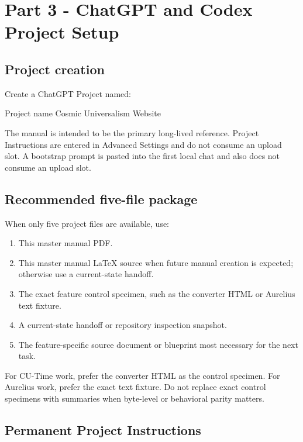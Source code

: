 \documentclass[11pt,letterpaper]{article}
\begin{document}
\section{Part 3 - ChatGPT and Codex Project Setup}

\subsection{Project creation}

Create a ChatGPT Project named:

\begin{codebox}{Project name}
Cosmic Universalism Website
\end{codebox}

The manual is intended to be the primary long-lived reference. Project
Instructions are entered in Advanced Settings and do not consume an upload
slot. A bootstrap prompt is pasted into the first local chat and also does not
consume an upload slot.

\subsection{Recommended five-file package}

When only five project files are available, use:

\begin{enumerate}
    \item This master manual PDF.
    \item This master manual \LaTeX{} source when future manual creation is
          expected; otherwise use a current-state handoff.
    \item The exact feature control specimen, such as the converter HTML or
          Aurelius text fixture.
    \item A current-state handoff or repository inspection snapshot.
    \item The feature-specific source document or blueprint most necessary for
          the next task.
\end{enumerate}

For CU-Time work, prefer the converter HTML as the control specimen. For
Aurelius work, prefer the exact text fixture. Do not replace exact control
specimens with summaries when byte-level or behavioral parity matters.

\subsection{Permanent Project Instructions}
\end{document}
